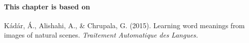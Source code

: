 \paragraph{This chapter is based on} Kádár, Á., Alishahi, A., \& Chrupala, G. (2015). 
Learning word meanings from images of natural scenes. \textit{Traitement Automatique des Langues.}

\newpage





%










%
%

%



%

